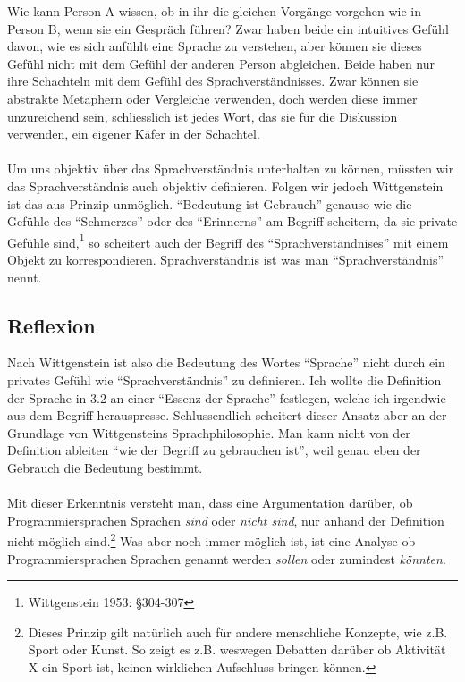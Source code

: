\documentclass[10pt,a4paper]{article}
\begin{document}
Wie kann Person A wissen, ob in ihr die gleichen Vorgänge vorgehen wie in Person B, wenn sie ein Gespräch führen? 
Zwar haben beide ein intuitives Gefühl davon, wie es sich anfühlt eine Sprache zu verstehen, aber können sie dieses Gefühl nicht mit dem Gefühl der anderen Person abgleichen. Beide haben nur ihre Schachteln mit dem Gefühl des Sprachverständnisses. Zwar können sie abstrakte Metaphern oder Vergleiche verwenden, doch werden diese immer unzureichend sein, schliesslich ist jedes Wort, das sie für die Diskussion verwenden, ein eigener Käfer in der Schachtel. \\ \\
Um uns objektiv über das Sprachverständnis unterhalten zu können, müssten wir das Sprachverständnis auch objektiv definieren. Folgen wir jedoch Wittgenstein ist das aus Prinzip unmöglich. \enquote{Bedeutung ist Gebrauch} genauso wie die Gefühle des \enquote{Schmerzes} oder des \enquote{Erinnerns} am Begriff scheitern, da sie private Gefühle sind,\footnote{Wittgenstein 1953: §304-307} so scheitert auch der Begriff des \enquote{Sprachverständnises} mit einem Objekt zu korrespondieren. Sprachverständnis ist was man \enquote{Sprachverständnis} nennt.


\subsection{Reflexion}
Nach Wittgenstein ist also die Bedeutung des Wortes \enquote{Sprache} nicht durch ein privates Gefühl wie \enquote{Sprachverständnis} zu definieren. Ich wollte die  Definition der Sprache in 3.2 an einer \enquote{Essenz der Sprache} festlegen, welche ich irgendwie aus dem Begriff herauspresse. Schlussendlich scheitert dieser Ansatz aber an der Grundlage von Wittgensteins Sprachphilosophie. Man kann nicht von der Definition ableiten \enquote{wie der Begriff zu gebrauchen ist}, weil genau eben der Gebrauch die Bedeutung bestimmt. \\
\\
Mit dieser Erkenntnis versteht man, dass eine Argumentation darüber, ob Programmiersprachen Sprachen \textit{sind} oder \textit{nicht sind}, nur anhand der Definition nicht möglich sind.\footnote{Dieses Prinzip gilt natürlich auch für andere menschliche Konzepte, wie z.B. Sport oder Kunst. So zeigt es z.B. weswegen Debatten darüber ob Aktivität X ein Sport ist, keinen wirklichen Aufschluss bringen können.} Was aber noch immer möglich ist, ist eine Analyse ob Programmiersprachen Sprachen genannt werden \textit{sollen} oder zumindest \textit{könnten}.
\end{document}
